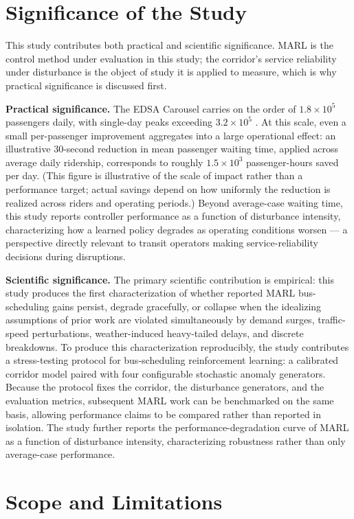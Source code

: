 \section{Significance of the Study}
This study contributes both practical and scientific significance. MARL is the control method under evaluation in this study; the corridor's service reliability under disturbance is the object of study it is applied to measure, which is why practical significance is discussed first.

\textbf{Practical significance.} The EDSA Carousel carries on the order of $1.8\times10^5$ passengers daily, with single-day peaks exceeding $3.2\times10^5$ \cite{DOTr2025Ridership}. At this scale, even a small per-passenger improvement aggregates into a large operational effect: an illustrative 30-second reduction in mean passenger waiting time, applied across average daily ridership, corresponds to roughly $1.5\times10^3$ passenger-hours saved per day. (This figure is illustrative of the scale of impact rather than a performance target; actual savings depend on how uniformly the reduction is realized across riders and operating periods.) Beyond average-case waiting time, this study reports controller performance as a function of disturbance intensity, characterizing how a learned policy degrades as operating conditions worsen --- a perspective directly relevant to transit operators making service-reliability decisions during disruptions.

\textbf{Scientific significance.} The primary scientific contribution is empirical: this study produces the first characterization of whether reported MARL bus-scheduling gains persist, degrade gracefully, or collapse when the idealizing assumptions of prior work are violated simultaneously by demand surges, traffic-speed perturbations, weather-induced heavy-tailed delays, and discrete breakdowns. To produce this characterization reproducibly, the study contributes a stress-testing protocol for bus-scheduling reinforcement learning: a calibrated corridor model paired with four configurable stochastic anomaly generators. Because the protocol fixes the corridor, the disturbance generators, and the evaluation metrics, subsequent MARL work can be benchmarked on the same basis, allowing performance claims to be compared rather than reported in isolation. The study further reports the performance-degradation curve of MARL as a function of disturbance intensity, characterizing robustness rather than only average-case performance.

\section{Scope and Limitations}
 
